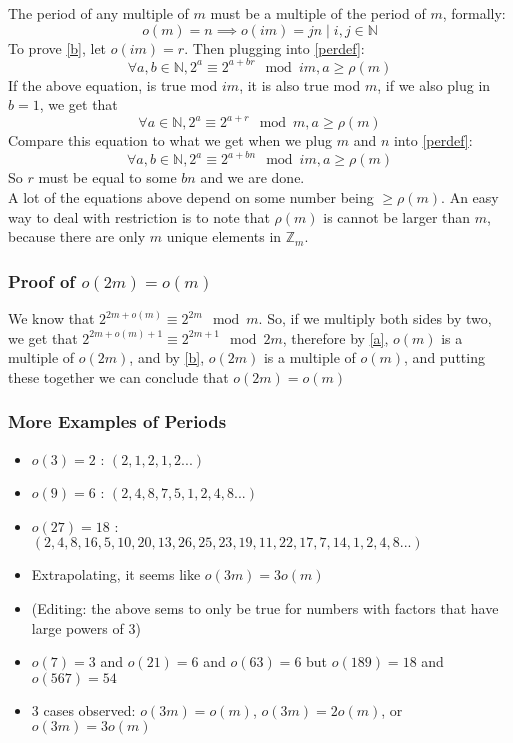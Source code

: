 \documentclass{article}
\begin{document}
  The period of any multiple of $m$ must be a multiple of the period of $m$, formally:
  \begin{equation}\label{b}
    o(m) = n \implies o(im) = jn \mid i, j \in \mathbb{N}
  \end{equation}
  To prove \eqref{b}, let $o(im) = r$. Then plugging into \eqref{perdef}:
  \begin{equation}
    \forall a, b \in \mathbb{N}, 2^a \equiv 2^{a+br} \mod im, a \geq \rho(m)
  \end{equation}
  If the above equation, is true mod $im$, it is also true mod $m$, if we also plug in $b=1$, we get that
  \begin{equation}
    \forall a \in \mathbb{N}, 2^a \equiv 2^{a+r} \mod m, a \geq \rho(m)
  \end{equation}
  Compare this equation to what we get when we plug $m$ and $n$ into \eqref{perdef}:
  \begin{equation}
    \forall a, b \in \mathbb{N}, 2^a \equiv 2^{a+bn} \mod im, a \geq \rho(m)
  \end{equation}
  So $r$ must be equal to some $bn$ and we are done.\\

  A lot of the equations above depend on some number being $\geq \rho(m)$. An easy way to deal with restriction is to note that $\rho(m)$ is cannot be larger than $m$, because there are only $m$ unique elements in $\mathbb{Z}_m$. 
  \subsubsection{Proof of $o(2m) = o(m)$}
  We know that $2^{2m+o(m)} \equiv 2^{2m} \mod m$. So, if we multiply both sides by two, we get that $2^{2m + o(m) + 1}\equiv 2^{2m+1} \mod 2m$, therefore by \eqref{a}, $o(m)$ is a multiple of $o(2m)$, and by \eqref{b}, $o(2m)$ is a multiple of $o(m)$, and putting these together we can conclude that $o(2m) = o(m)$  
  \subsubsection{More Examples of Periods}
  \begin{itemize}
  \item $o(3) = 2$ : $(2, 1, 2, 1, 2 ...)$
  \item $o(9) = 6$ : $(2, 4, 8, 7, 5, 1, 2, 4, 8 ...)$
  \item $o(27) = 18$ : $(2, 4, 8, 16, 5, 10, 20, 13, 26, 25, 23, 19, 11, 22, 17, 7, 14, 1, 2, 4, 8 ...)$
  \item Extrapolating, it seems like $o(3m) = 3o(m)$
  \item (Editing: the above sems to only be true for numbers with factors that have large powers of 3)
  \item $o(7) = 3$ and $o(21) = 6$ and $o(63) = 6$ but $o(189) = 18$ and $o(567) = 54$
  \item 3 cases observed: $o(3m) = o(m)$, $o(3m) = 2o(m)$, or $o(3m) = 3o(m)$
  \end{itemize}
\end{document}
